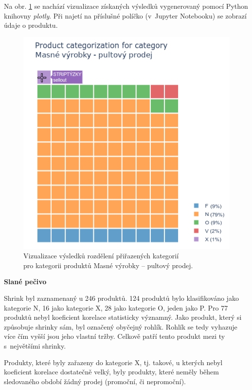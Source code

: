 Na obr. \ref*{obr:kor:vyslMASO} se nachází vizualizace získaných výsledků vygenerovaný pomocí Python knihovny \emph{plotly}. Při najetí na příslušné políčko (v~Jupyter Notebooku) se zobrazí údaje o produktu.

\begin{figure}[h!]
    \centering
    \captionsetup{justification=centering}
    \includegraphics[width=.7\textwidth]{obrazky/zntb/vysledekMASO.png}
    \caption{Vizualizace výsledků rozdělení přiřazených kategorií \\ pro kategorii produktů Masné výrobky -- pultový prodej.}
    \label{obr:kor:vyslMASO}
\end{figure}


\textbf{Slané pečivo}

Shrink byl zaznamenaný u 246 produktů. 124 produktů bylo klasifikováno jako kategorie N, 16 jako kategorie X, 28 jako kategorie O, jeden jako P. Pro 77 produktů nebyl koeficient korelace statisticky významný. Jako produkt, který si způsobuje shrinky sám, byl označený obyčejný rohlík. Rohlík se tedy vyhazuje více čím vyšší jsou jeho vlastní tržby. Celkově patří tento produkt mezi ty s~největšími shrinky.

Produkty, které byly zařazeny do kategorie X, tj. takové, u kterých nebyl koeficient korelace dostatečně velký, byly produkty, které neměly během sledovaného období žádný prodej (promoční, či nepromoční).


